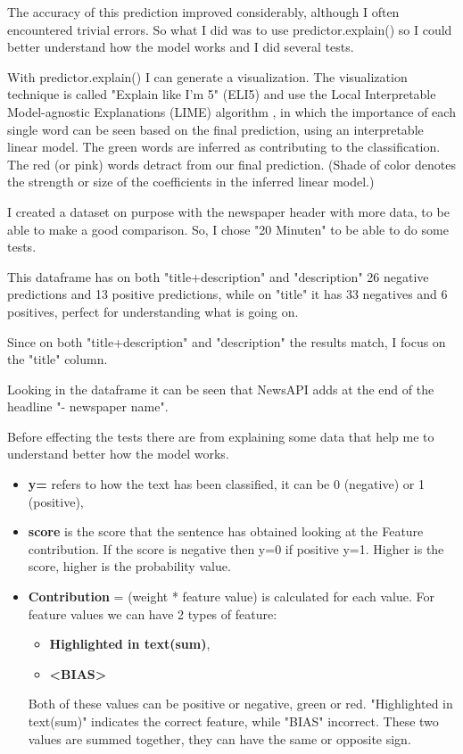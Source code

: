 The accuracy of this prediction improved considerably, although I often encountered trivial errors.
So what I did was to use predictor.explain() so I could better understand how the model works and I did several tests.

With predictor.explain() I can generate a visualization.
The visualization technique is called "Explain like I’m 5" (ELI5)\cite{noauthor_textexplainer_nodate} and use the Local Interpretable Model-agnostic Explanations (LIME) algorithm \cite{ribeiro_why_2016}\cite{ribeiro_marcotcrlime_2021}, in which the importance of each single word can be seen based on the final prediction, using an interpretable linear model.
The green words are inferred as contributing to the classification. The red (or pink) words detract from our final prediction. (Shade of color denotes the strength or size of the coefficients in the inferred linear model.)

I created a dataset on purpose with the newspaper header with more data, to be able to make a good comparison.
So, I chose "20 Minuten" to be able to do some tests.

This dataframe has on both "title+description" and "description" 26 negative predictions and 13 positive predictions, while on "title" it has 33 negatives and 6 positives, perfect for understanding what is going on.

Since on both "title+description" and "description" the results match, I focus on the "title" column.

Looking in the dataframe it can be seen that NewsAPI adds at the end of the headline "- newspaper name".

Before effecting the tests there are from explaining some data that help me to understand better how the model works.
\begin{itemize}
    \item \textbf{y=} refers to how the text has been classified, it can be 0 (negative) or 1 (positive),
    \item \textbf{score} is the score that the sentence has obtained looking at the Feature contribution. If the score is negative then y=0 if positive y=1. Higher is the score, higher is the probability value.
    \item \textbf{Contribution} = (weight * feature value) is calculated for each value. For feature values we can have 2 types of feature:
    \begin{itemize}
        \item \textbf{Highlighted in text(sum)},
        \item \textbf{<BIAS>}
    \end{itemize}
    Both of these values can be positive or negative, green or red.
    "Highlighted in text(sum)" indicates the correct feature, while "BIAS" incorrect. These two values are summed together, they can have the same or opposite sign.
\end{itemize}

